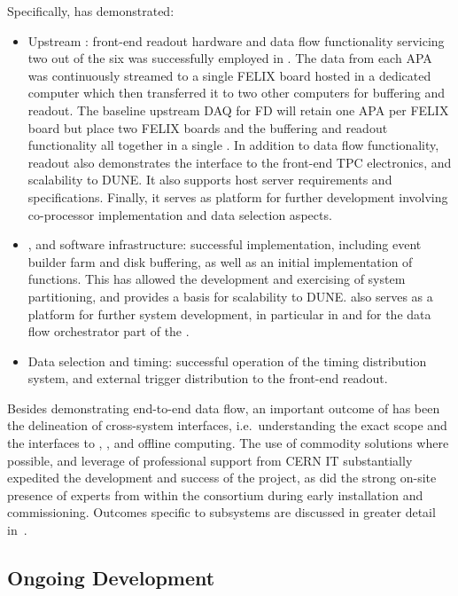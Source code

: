 Specifically,  has demonstrated: 
\begin{itemize}
\item Upstream : front-end readout hardware and data flow functionality servicing two out of the six  was successfully employed in .
  The data from each APA was continuously streamed to a single FELIX board hosted in a dedicated computer which then transferred it to two other computers for buffering and readout.
  The baseline upstream DAQ for  FD will retain one APA per FELIX board but place two FELIX boards and the buffering and readout functionality all together in a single . 
  In addition to data flow functionality,   readout also demonstrates the interface to the front-end TPC electronics, and scalability to DUNE. It also supports host server requirements and specifications. Finally, it serves as platform for further development involving co-processor implementation and data selection aspects.
\item {},  and software infrastructure:
 successful  implementation, including event builder
  farm and disk buffering, as well as an initial implementation of  functions. This has allowed the
  development and exercising of system partitioning, and provides a
  basis for scalability to DUNE.  also serves as
  a platform for further system development, in particular in  and for the data flow orchestrator part of the
  .
\item Data selection and timing: successful operation of the timing
  distribution system, and external trigger distribution to the
  front-end readout.
\end{itemize}

Besides demonstrating end-to-end data flow, an important outcome of
 has been the delineation of cross-system
interfaces, i.e.~understanding the exact  scope and the interfaces to , , and offline computing. The use of commodity solutions
where possible, and leverage of professional support from CERN IT 
substantially expedited the development and success of the project, as
did the strong on-site presence of experts from within the consortium during early installation and
commissioning. 
Outcomes specific to  subsystems are discussed in
greater detail in~\cite{Hennessy:CDRReview}. 

\subsection{Ongoing Development}
\label{sec:sp-daq:design-validation}

